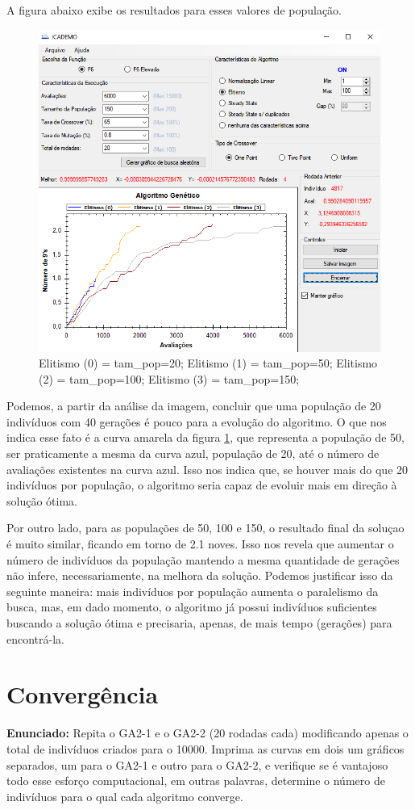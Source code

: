 \documentclass[12pt]{article}
\begin{document}
A figura abaixo exibe os resultados para esses valores de população.

\begin{figure}[H]
	\centering
	\includegraphics[width=0.7\linewidth]{Imagens/questao4}
	\caption{Elitismo (0) = tam\_pop=20; Elitismo (1) = tam\_pop=50; Elitismo (2) = tam\_pop=100; Elitismo (3) = tam\_pop=150;}
	\label{fig:questao4}
\end{figure}

Podemos, a partir da análise da imagem, concluir que uma população de 20 indivíduos com 40 gerações é pouco para a evolução do algoritmo. O que nos indica esse fato é a curva amarela da figura \ref{fig:questao4}, que representa a população de 50, ser praticamente a mesma da curva azul, população de 20, até o número de avaliações existentes na curva azul. Isso nos indica que, se houver mais do que 20 indivíduos por população, o algoritmo seria capaz de evoluir mais em direção à solução ótima. 

Por outro lado, para as populações de 50, 100 e 150, o resultado final da soluçao é muito similar, ficando em torno de 2.1 noves. Isso nos revela que aumentar o número de indivíduos da população mantendo a mesma quantidade de gerações não infere, necessariamente, na melhora da solução. Podemos justificar isso da seguinte maneira: mais indivíduos por população aumenta o paralelismo da busca, mas, em dado momento, o algoritmo já possui indivíduos suficientes buscando a solução ótima e precisaria, apenas, de mais tempo (gerações) para encontrá-la. 

\section{Convergência}
\textbf{Enunciado:}
Repita o GA2-1 e o GA2-2 (20 rodadas cada) modificando apenas o total de indivíduos criados para o 10000. Imprima as curvas em dois um gráficos separados, um para o GA2-1 e outro para o GA2-2, e verifique se é vantajoso todo esse esforço computacional, em outras palavras, determine o número de
indivíduos para o qual cada algoritmo converge.\\
\end{document}
